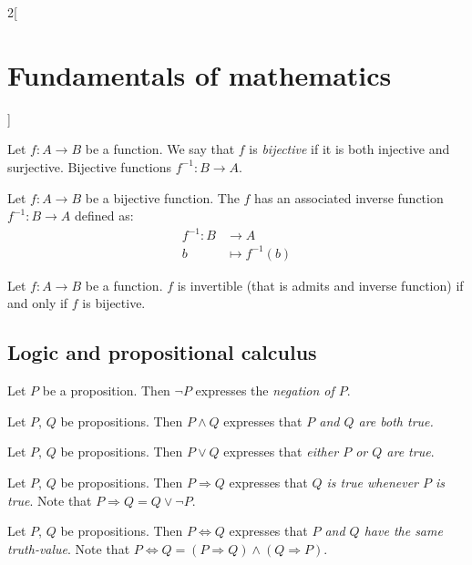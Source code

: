 \documentclass[../../../main.tex]{subfiles}
\begin{document}
\begin{multicols}{2}[\section{Fundamentals of mathematics}]
\begin{prop}
    \end{prop}
    \begin{definition}
        Let $f:A\rightarrow B$ be a function. We say that $f$ is \textit{bijective} if it is both injective and surjective. Bijective functions $f^{-1}:B\rightarrow A$.
    \end{definition}
    \begin{prop}
        Let $f:A\rightarrow B$ be a bijective function. The $f$ has an associated inverse function $f^{-1}:B\rightarrow A$ defined as:
        \begin{align*}
            f^{-1}:B&\longrightarrow A\\
            b&\longmapsto f^{-1}(b)
        \end{align*}
    \end{prop}
    \begin{theorem}
        Let $f:A\rightarrow B$ be a function. $f$ is invertible (that is admits and inverse function) if and only if $f$ is bijective.
    \end{theorem}
    \subsection{Logic and propositional calculus}
    \begin{definition}
        Let $P$ be a proposition. Then $\lnot P$ expresses the \textit{negation of $P$}. 
    \end{definition}
    \begin{definition}
        Let $P$, $Q$ be propositions. Then $P\land Q$ expresses that \textit{$P$ and $Q$ are both true.}
    \end{definition}
    \begin{definition}
        Let $P$, $Q$ be propositions. Then $P\lor Q$ expresses that \textit{either $P$ or $Q$ are true}.
    \end{definition}
    \begin{definition}
        Let $P$, $Q$ be propositions. Then $P\Rightarrow Q$ expresses that \textit{$Q$ is true whenever $P$ is true}. Note that $P\Rightarrow Q=Q\lor\lnot P$.
    \end{definition}
    \begin{definition}
        Let $P$, $Q$ be propositions. Then $P\Leftrightarrow Q$ expresses that \textit{$P$ and $Q$ have the same truth-value}. Note that $P\Leftrightarrow Q=(P\Rightarrow Q)\land(Q\Rightarrow P)$.
    \end{definition}

\end{multicols}
\end{document}
